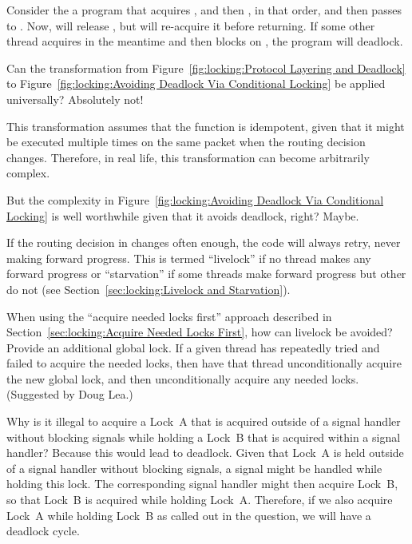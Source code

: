 \begin{enumerate}
	Consider the a program that acquires , and then
	, in that order, and then passes 
	to .
	Now,  will release , but
	will re-acquire it before returning.
	If some other thread acquires  in the meantime
	and then blocks on , the program will deadlock.

\QuickQ{}
	Can the transformation from
	Figure~\ref{fig:locking:Protocol Layering and Deadlock} to
	Figure~\ref{fig:locking:Avoiding Deadlock Via Conditional Locking}
	be applied universally?
\QuickA{}
	Absolutely not!

	This transformation assumes that the
	 function is idempotent, given that
	it might be executed multiple times on the same packet when
	the  routing decision changes.
	Therefore, in real life, this transformation can become
	arbitrarily complex.

\QuickQ{}
	But the complexity in
	Figure~\ref{fig:locking:Avoiding Deadlock Via Conditional Locking}
	is well worthwhile given that it avoids deadlock, right?
\QuickA{}
	Maybe.

	If the routing decision in  changes often enough,
	the code will always retry, never making forward progress.
	This is termed ``livelock'' if no thread makes any forward progress or
	``starvation''
	if some threads make forward progress but other do not
	(see Section~\ref{sec:locking:Livelock and Starvation}).

\QuickQ{}
	When using the ``acquire needed locks first'' approach described in
	Section~\ref{sec:locking:Acquire Needed Locks First},
	how can livelock be avoided?
\QuickA{}
	Provide an additional global lock.
	If a given thread has repeatedly tried and failed to acquire the needed
	locks, then have that thread unconditionally acquire the new
	global lock, and then unconditionally acquire any needed locks.
	(Suggested by Doug Lea.)

\QuickQ{}
	Why is it illegal to acquire a Lock~A that is acquired outside
	of a signal handler without blocking signals while holding
	a Lock~B that is acquired within a signal handler?
\QuickA{}
	Because this would lead to deadlock.
	Given that Lock~A is held outside of a signal
	handler without blocking signals, a signal might be handled while
	holding this lock.
	The corresponding signal handler might then acquire
	Lock~B, so that Lock~B is acquired while holding Lock~A.
	Therefore, if we also acquire Lock~A while holding Lock~B
	as called out in the question, we will have a deadlock cycle.


\end{enumerate}
